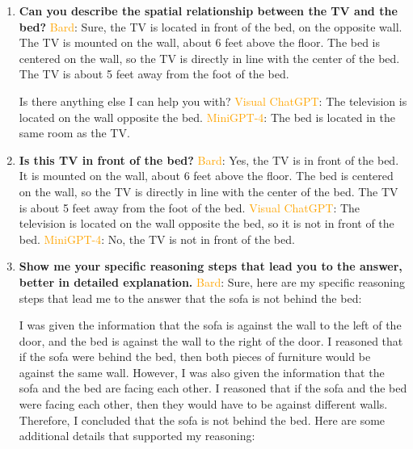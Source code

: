 \begin{enumerate}
    \item \textbf{Can you describe the spatial relationship between the TV and the bed?}
    \subitem \textcolor{orange}{Bard}: 
    Sure, the TV is located in front of the bed, on the opposite wall. The TV is mounted on the wall, about 6 feet above the floor. The bed is centered on the wall, so the TV is directly in line with the center of the bed. The TV is about 5 feet away from the foot of the bed.

    Is there anything else I can help you with?
    \subitem \textcolor{orange}{Visual ChatGPT}: The television is located on the wall opposite the bed.
    \subitem \textcolor{orange}{MiniGPT-4}: The bed is located in the same room as the TV.
    \item \textbf{Is this TV in front of the bed?}
    \subitem \textcolor{orange}{Bard}: 
    Yes, the TV is in front of the bed. It is mounted on the wall, about 6 feet above the floor. The bed is centered on the wall, so the TV is directly in line with the center of the bed. The TV is about 5 feet away from the foot of the bed.
    \subitem \textcolor{orange}{Visual ChatGPT}: The television is located on the wall opposite the bed, so it is not in front of the bed.
    \subitem \textcolor{orange}{MiniGPT-4}: No, the TV is not in front of the bed.
    \item \textbf{Show me your specific reasoning steps that lead you to the answer, better in detailed explanation.}
    \subitem \textcolor{orange}{Bard}: 
    Sure, here are my specific reasoning steps that lead me to the answer that the sofa is not behind the bed:

    I was given the information that the sofa is against the wall to the left of the door, and the bed is against the wall to the right of the door.
    I reasoned that if the sofa were behind the bed, then both pieces of furniture would be against the same wall.
    However, I was also given the information that the sofa and the bed are facing each other.
    I reasoned that if the sofa and the bed were facing each other, then they would have to be against different walls.
    Therefore, I concluded that the sofa is not behind the bed.
    Here are some additional details that supported my reasoning:


\end{enumerate}

